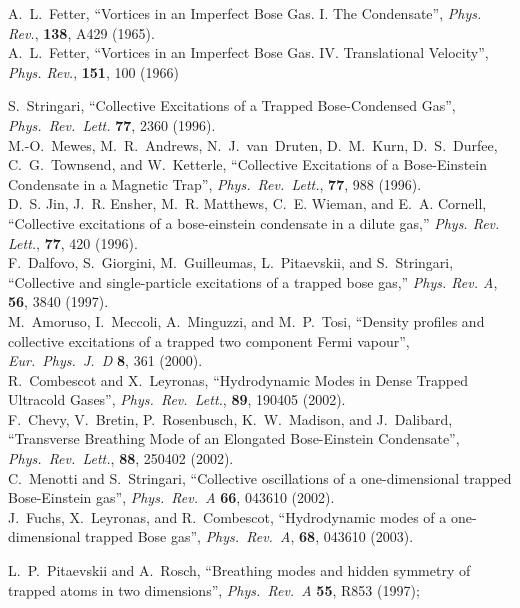 \documentclass[a4paper, onecolumn]{revtex4-1}
\begin{document}
\begin{thebibliography}{1}
%
A.~L.~Fetter, 
``Vortices in an Imperfect Bose Gas. I. The Condensate'', 
{\em Phys. Rev.}, {\bf 138}, A429 (1965).
%
\\ 
%
A.~L.~Fetter, 
``Vortices in an Imperfect Bose Gas. IV. Translational Velocity'', 
{\em Phys. Rev.}, {\bf 151}, 100 (1966)

 

 S.~Stringari, ``Collective Excitations of a Trapped
  Bose-Condensed Gas'', {\em Phys.\ Rev.\ Lett.}  \textbf{77}, 2360 (1996).
%
\\ 
%
M.-O.~Mewes, M.~R.~Andrews, N.~J.~van~Druten, D.~M.~Kurn, D.~S.~Durfee, 
C.~G.~Townsend, and W.~Ketterle, ``Collective Excitations of a Bose-Einstein Condensate in a Magnetic
Trap'', {\em Phys.\ Rev.\ Lett.}, \textbf{77}, 988 (1996).
%
\\ 
%
D.~S. Jin, J.~R. Ensher, M.~R. Matthews, C.~E. Wieman, and E.~A. Cornell,
  ``Collective excitations of a bose-einstein condensate in a dilute gas,''
  {\em Phys. Rev. Lett.}, {\bf 77}, 420 (1996).
%
\\
%
F.~Dalfovo, S.~Giorgini, M.~Guilleumas, L.~Pitaevskii, and S.~Stringari,
  ``Collective and single-particle excitations of a trapped bose gas,'' {\em
  Phys. Rev. A}, {\bf 56}, 3840 (1997).
%
\\
%
M.~Amoruso, I.~Meccoli, A.~Minguzzi, and M.~P.~Tosi,  ``Density profiles and collective excitations of
a trapped two component Fermi vapour'', {\em Eur.\ Phys.\ J.~D} \textbf{8}, 361 (2000).
%
\\ 
%
R.~Combescot and X.~Leyronas, 
``Hydrodynamic Modes in Dense Trapped Ultracold Gases'', {\em Phys.\ Rev.\ Lett.}, \textbf{89}, 190405 (2002).
%
\\ 
%
F.~Chevy, V.~Bretin, P.~Rosenbusch, K.~W.~Madison, and J.~Dalibard, 
``Transverse Breathing Mode of an Elongated Bose-Einstein Condensate'', 
{\em Phys.\ Rev.\ Lett.}, \textbf{88}, 250402 (2002).
%
\\ 
%
C.~Menotti and S.~Stringari, ``Collective oscillations of a one-dimensional trapped Bose-Einstein
gas'', {\em Phys.\ Rev.\ A} \textbf{66}, 043610 (2002).
%
\\ 
%
J.~Fuchs, X.~Leyronas, and R.~Combescot, 
``Hydrodynamic modes of a one-dimensional trapped Bose gas'', 
{\em Phys.\ Rev.\ A}, \textbf{68}, 043610 (2003).


%
L.~P.~Pitaevskii and A.~Rosch, 
``Breathing modes and hidden symmetry of trapped atoms in two
dimensions'', {\em Phys.\ Rev.\ A} \textbf{55}, R853 (1997);


\end{thebibliography}
\end{document}
